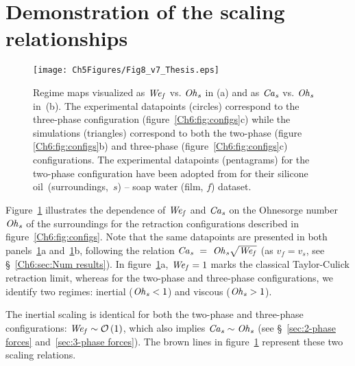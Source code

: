 \section{Demonstration of the scaling relationships}\label{sec:scaling}
\begin{sidewaysfigure}
	\centering
	\texttt{[image: Ch5Figures/Fig8\_v7\_Thesis.eps]}
	\caption{Regime maps visualized as $\mathit{We}_\mathit{f}$ vs. $\mathit{Oh}_\mathit{s}$ in (a) and as $\mathit{Ca}_\mathit{s}$ vs. $\mathit{Oh}_\mathit{s}$ in~(b). The experimental datapoints (circles) correspond to the three-phase configuration (figure~\ref{Ch6:fig:configs}c) while the simulations (triangles) correspond to both the two-phase (figure \ref{Ch6:fig:configs}b) and three-phase (figure~\ref{Ch6:fig:configs}c) configurations. The experimental datapoints (pentagrams) for the two-phase configuration have been adopted from \citet{reyssat-2006-epl} for their silicone oil~(surroundings,~$s$) -- soap water (film, $f$) dataset.}
	\label{fig:scalingFinal}
\end{sidewaysfigure}

Figure~\ref{fig:scalingFinal} illustrates the dependence of $\mathit{We}_\mathit{f}$ and $\mathit{Ca}_\mathit{s}$ on the Ohnesorge number $\mathit{Oh}_\mathit{s}$ of the surroundings for the retraction configurations described in figure~\ref{Ch6:fig:configs}. Note that the same datapoints are presented in both panels~\ref{fig:scalingFinal}a and~\ref{fig:scalingFinal}b, following the relation $\mathit{Ca}_\mathit{s}~=~\mathit{Oh}_\mathit{s}\sqrt{\mathit{We}_\mathit{f}}$ (as $v_f = v_s$, see \S~\ref{Ch6:sec:Num results}). In figure~\ref{fig:scalingFinal}a, $\mathit{We}_\mathit{f} = 1$ marks the classical Taylor-Culick retraction limit, whereas for the two-phase and three-phase configurations, we identify two regimes: inertial ($\mathit{Oh}_\mathit{s} < 1$) and viscous ($\mathit{Oh}_\mathit{s} > 1$). 

The inertial scaling is identical for both the two-phase and three-phase configurations: $\mathit{We}_\mathit{f} \sim \mathcal{O}\left(1\right)$, which also implies $\mathit{Ca}_\mathit{s} \sim \mathit{Oh}_\mathit{s}$ (see \S~\ref{sec:2-phase forces} and~\ref{sec:3-phase forces}). The brown lines in figure~\ref{fig:scalingFinal} represent these two scaling relations.

